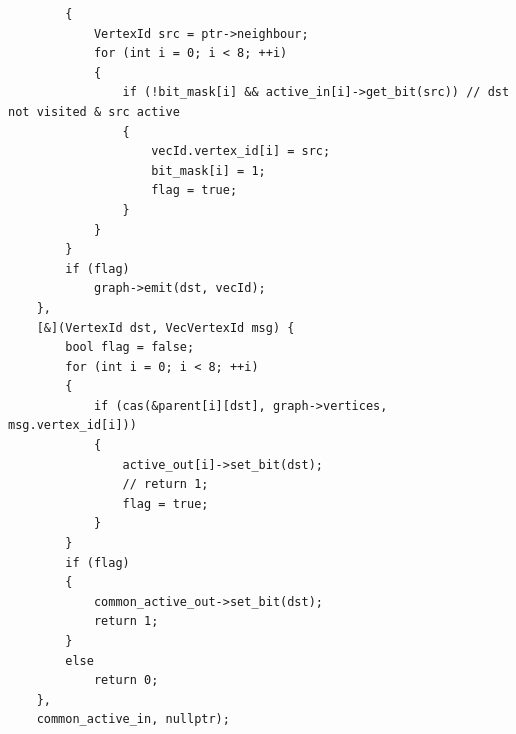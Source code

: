 \documentclass[logo,reportComp]{thesis}
\begin{document}
\begin{lstlisting}
        {
            VertexId src = ptr->neighbour;
            for (int i = 0; i < 8; ++i)
            {
                if (!bit_mask[i] && active_in[i]->get_bit(src)) // dst not visited & src active
                {
                    vecId.vertex_id[i] = src;
                    bit_mask[i] = 1;
                    flag = true;
                }
            }
        }
        if (flag)
            graph->emit(dst, vecId);
    },
    [&](VertexId dst, VecVertexId msg) {
        bool flag = false;
        for (int i = 0; i < 8; ++i)
        {
            if (cas(&parent[i][dst], graph->vertices, msg.vertex_id[i]))
            {
                active_out[i]->set_bit(dst);
                // return 1;
                flag = true;
            }
        }
        if (flag)
        {
            common_active_out->set_bit(dst);
            return 1;
        }
        else
            return 0;
    },
    common_active_in, nullptr);
\end{lstlisting}
\end{document}
